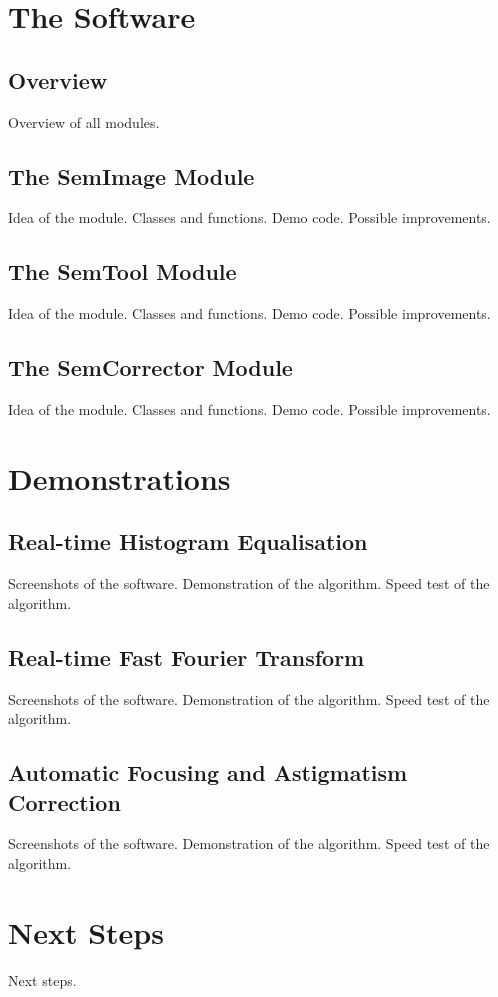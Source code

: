 \documentclass{article}
\begin{document}
\section{The Software}
\subsection{Overview}
Overview of all modules.

\subsection{The SemImage Module}
Idea of the module.
Classes and functions.
Demo code.
Possible improvements.

\subsection{The SemTool Module}
Idea of the module.
Classes and functions.
Demo code.
Possible improvements.

\subsection{The SemCorrector Module}
Idea of the module.
Classes and functions.
Demo code.
Possible improvements.

\section{Demonstrations}
\subsection{Real-time Histogram Equalisation}
Screenshots of the software.
Demonstration of the algorithm.
Speed test of the algorithm.

\subsection{Real-time Fast Fourier Transform}
Screenshots of the software.
Demonstration of the algorithm.
Speed test of the algorithm.

\subsection{Automatic Focusing and Astigmatism Correction}
Screenshots of the software.
Demonstration of the algorithm.
Speed test of the algorithm.

\section{Next Steps}
Next steps.
\end{document}
